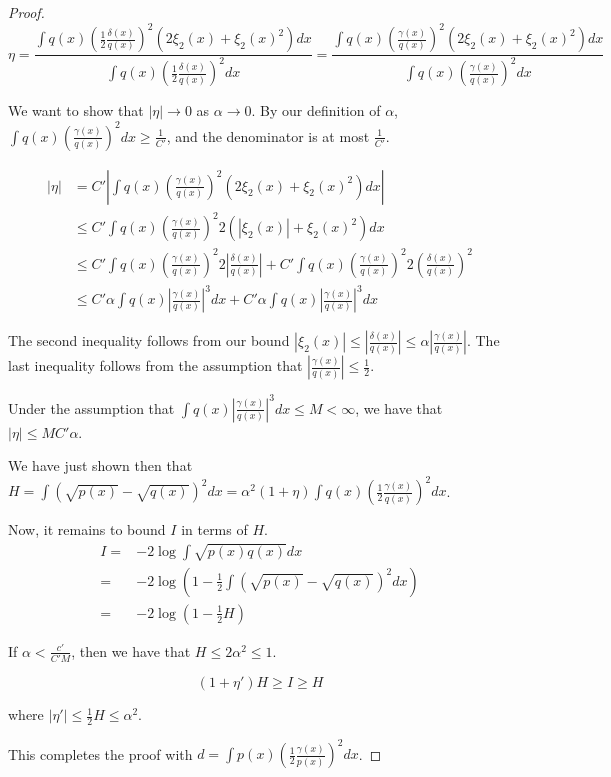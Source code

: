 \documentclass{article}
\begin{document}
\begin{proof}
\[
\eta = \frac{ \int q(x) \left( \frac{1}{2} \frac{\delta(x)}{q(x)} \right)^2 ( 2 \xi_2(x) + \xi_2(x)^2 )  dx }
             { \int q(x) \left( \frac{1}{2} \frac{\delta(x)}{q(x)} \right)^2 dx} 
  = \frac{ \int q(x) \left( \frac{\gamma(x)}{q(x)} \right)^2 ( 2 \xi_2(x) + \xi_2(x)^2 )  dx }
             { \int q(x) \left( \frac{\gamma(x)}{q(x)} \right)^2 dx} 
\]

We want to show that $|\eta| \rightarrow 0$ as $\alpha \rightarrow 0$. By our definition of $\alpha$, $\int q(x) \left( \frac{\gamma(x)}{q(x)} \right)^2 dx \geq \frac{1}{C'}$, and the denominator is at most $\frac{1}{C'}$. 

\begin{align*}
|\eta| &= C' \left| \int q(x) \left(\frac{\gamma(x)}{q(x)} \right)^2 ( 2 \xi_2(x) + \xi_2(x)^2 )  dx \right| \\
    &\leq C' \int q(x) \left( \frac{\gamma(x)}{q(x)} \right)^2 2 (| \xi_2(x) | + \xi_2(x)^2) dx \\
    &\leq C' \int q(x) \left( \frac{\gamma(x)}{q(x)} \right)^2 
           2\left| \frac{\delta(x)}{q(x)} \right| +
         C' \int q(x) \left( \frac{\gamma(x)}{q(x)} \right)^2 
           2\left( \frac{\delta(x)}{q(x)} \right)^2  \\
    &\leq C' \alpha \int q(x) \left| \frac{\gamma(x)}{q(x)} \right|^3 dx + 
          C' \alpha \int q(x) \left| \frac{\gamma(x)}{q(x)} \right|^3 dx
\end{align*}
   
The second inequality follows from our bound $|\xi_2(x)| \leq \left| \frac{\delta(x)}{q(x)} \right| \leq \alpha \left| \frac{\gamma(x)}{q(x)} \right|$. The last inequality follows from the assumption that $\left| \frac{\gamma(x)}{q(x)} \right| \leq \frac{1}{2}$. 

Under the assumption that $\int q(x) \left| \frac{\gamma(x)}{q(x)} \right|^3 dx \leq M < \infty$,  we have that $| \eta | \leq M C' \alpha$. 

We have just shown then that $H = \int (\sqrt{p(x)} - \sqrt{q(x)})^2 dx = \alpha^2 (1+\eta) \int q(x) \left( \frac{1}{2} \frac{\gamma(x)}{q(x)} \right)^2 dx$. 


Now, it remains to bound $I$ in terms of $H$. 
\begin{align*}
I =& -2 \log \int \sqrt{p(x)q(x)} dx \\
 =& -2 \log \left( 1 - \frac{1}{2} \int (\sqrt{p(x)} - \sqrt{q(x)})^2 dx \right) \\
 =& -2 \log (1 - \frac{1}{2} H) 
\end{align*}

If $\alpha < \frac{c'}{C' M}$, then we have that $H \leq 2 \alpha^2 \leq 1$.

\[
(1 + \eta') H \geq I \geq H
\]

where $|\eta'| \leq \frac{1}{2} H  \leq \alpha^2 $. 

This completes the proof with $d = \int p(x) \left( \frac{1}{2} \frac{\gamma(x)}{p(x)} \right)^2 dx$. 

\end{proof}
\end{document}
